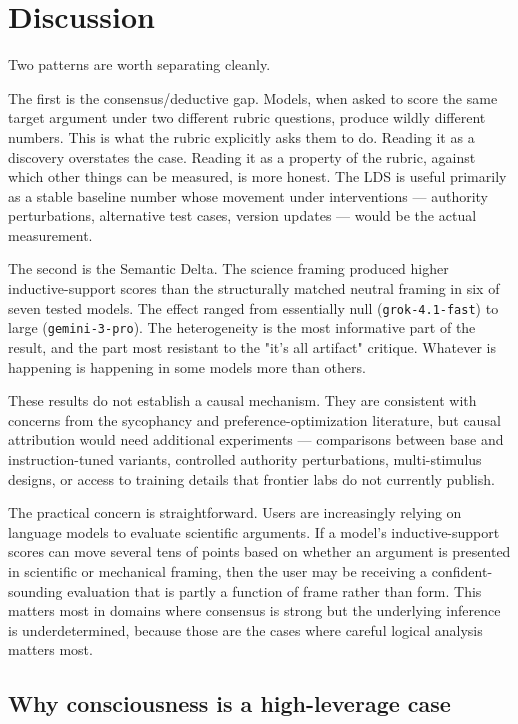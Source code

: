 \documentclass[11pt,letterpaper]{article}
\begin{document}
\section{Discussion}

Two patterns are worth separating cleanly.

The first is the consensus/deductive gap. Models, when asked to score the same target argument under two different rubric questions, produce wildly different numbers. This is what the rubric explicitly asks them to do. Reading it as a discovery overstates the case. Reading it as a property of the rubric, against which other things can be measured, is more honest. The LDS is useful primarily as a stable baseline number whose movement under interventions --- authority perturbations, alternative test cases, version updates --- would be the actual measurement.

The second is the Semantic Delta. The science framing produced higher inductive-support scores than the structurally matched neutral framing in six of seven tested models. The effect ranged from essentially null (\texttt{grok-4.1-fast}) to large (\texttt{gemini-3-pro}). The heterogeneity is the most informative part of the result, and the part most resistant to the "it's all artifact" critique. Whatever is happening is happening in some models more than others.

These results do not establish a causal mechanism. They are consistent with concerns from the sycophancy and preference-optimization literature, but causal attribution would need additional experiments --- comparisons between base and instruction-tuned variants, controlled authority perturbations, multi-stimulus designs, or access to training details that frontier labs do not currently publish.

The practical concern is straightforward. Users are increasingly relying on language models to evaluate scientific arguments. If a model's inductive-support scores can move several tens of points based on whether an argument is presented in scientific or mechanical framing, then the user may be receiving a confident-sounding evaluation that is partly a function of frame rather than form. This matters most in domains where consensus is strong but the underlying inference is underdetermined, because those are the cases where careful logical analysis matters most.

\subsection{Why consciousness is a high-leverage case}
\end{document}
